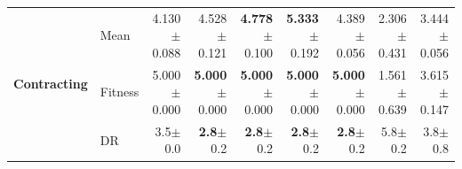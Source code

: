 \begin{table}[htbp]
{\begin{tabular}{ll||r|rrrrrr}
\midrule
\multirow{3}{*}{\textbf{Contracting}} & Mean & \cellcolor[HTML]{FAEBC9} 4.130{\scriptsize\color{black!60}$\pm$0.088} & 4.528{\scriptsize\color{black!60}$\pm$0.121} & \textbf{4.778}{\scriptsize\color{black!60}$\pm$0.100} & \textbf{5.333}{\scriptsize\color{black!60}$\pm$0.192} & 4.389{\scriptsize\color{black!60}$\pm$0.056} & \textcolor{black!60}{2.306}{\scriptsize\color{black!60}$\pm$0.431} & \textcolor{black!60}{3.444}{\scriptsize\color{black!60}$\pm$0.056} \\
 & Fitness & \cellcolor[HTML]{F2CF80} 5.000{\scriptsize\color{black!60}$\pm$0.000} & \textbf{5.000}{\scriptsize\color{black!60}$\pm$0.000} & \textbf{5.000}{\scriptsize\color{black!60}$\pm$0.000} & \textbf{5.000}{\scriptsize\color{black!60}$\pm$0.000} & \textbf{5.000}{\scriptsize\color{black!60}$\pm$0.000} & \textcolor{black!60}{1.561}{\scriptsize\color{black!60}$\pm$0.639} & \textcolor{black!60}{3.615}{\scriptsize\color{black!60}$\pm$0.147} \\
 & DR & 3.5{\scriptsize\color{black!60}$\pm$0.0} & \textbf{2.8}{\scriptsize\color{black!60}$\pm$0.2} & \textbf{2.8}{\scriptsize\color{black!60}$\pm$0.2} & \textbf{2.8}{\scriptsize\color{black!60}$\pm$0.2} & \textbf{2.8}{\scriptsize\color{black!60}$\pm$0.2} & \textcolor{black!60}{5.8}{\scriptsize\color{black!60}$\pm$0.2} & \textcolor{black!60}{3.8}{\scriptsize\color{black!60}$\pm$0.8} \\
\bottomrule
\end{tabular}
}
\end{table}


